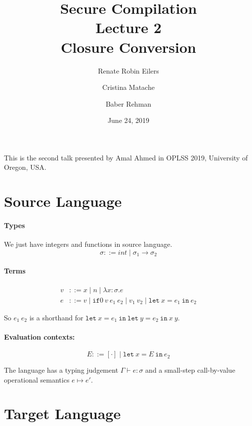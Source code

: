 \documentclass{article}
\title{Secure Compilation \\ \Large{Lecture 2} \\ Closure Conversion}
\author{Renate Robin Eilers  \and Cristina Matache \and Baber Rehman}
\date{June 24, 2019}
\newcommand{\letin}[3]{\mathtt{let}\ #1=#2\ \mathtt{in}\ #3}
\newcommand{\ifzero}[3]{\mathtt{if}0\ #1\ #2\ #3}
\begin{document}
\maketitle

This is the second talk presented by Amal Ahmed in OPLSS 2019, University of Oregon, USA.


\section{Source Language}

\paragraph{Types}

We just have integers and functions in source language. \\

\begin{equation*}
  \sigma ::= int \mid \sigma_1\rightarrow\sigma_2
\end{equation*}

\paragraph{Terms}

\begin{align*}
  v &::= x \mid n \mid \lambda x:\sigma.e \\
  e &::= v \mid \ifzero{v}{e_1}{e_2} \mid v_1\ v_2 \mid \letin{x}{e_1}{e_2}
\end{align*}

So $e_1\ e_2$ is a shorthand for $\letin{x}{e_1}{\letin{y}{e_2}{x\ y}}$.

\paragraph{Evaluation contexts:}

\begin{equation*}
  E ::= [\cdot] \mid \letin{x}{E}{e_2}
\end{equation*}

The language has a typing judgement $\Gamma \vdash e:\sigma$ and a small-step call-by-value operational semantics $e \mapsto e'$.

\section{Target Language}
\end{document}
